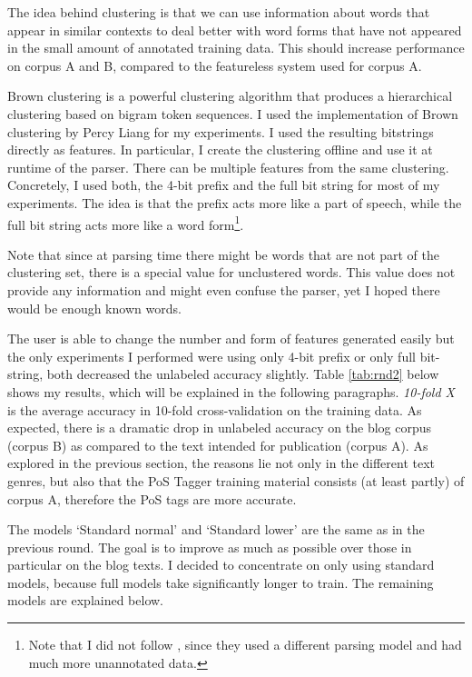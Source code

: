 \documentclass[11pt,letterpaper, covington]{article}
\begin{document}
The idea behind clustering is that we can use information about words that appear in similar contexts to deal better with word forms that have not appeared in the small amount of annotated training data. This should increase performance on corpus A and B, compared to the featureless system used for corpus A.

Brown clustering \citep{BSMPL92} is a powerful clustering algorithm that produces a hierarchical clustering based on bigram token sequences. I used the implementation of Brown clustering by Percy Liang \citep{liang05} for my experiments. I used the resulting bitstrings directly as features. In particular, I create the clustering offline and use it at runtime of the parser. There can be multiple features from the same clustering. Concretely, I used both, the 4-bit prefix and the full bit string for most of my experiments. The idea is that the prefix acts more like a part of speech, while the full bit string acts more like a word form\citep{KCC08}\footnote{Note that I did not follow \citet{KCC08}, since they used a different parsing model and had much more unannotated data.}.

Note that since at parsing time there might be words that are not part of the clustering set, there is a special value for unclustered words. This value does not provide any information and might even confuse the parser, yet I hoped there would be enough known words.

The user is able to change the number and form of features generated easily but the only experiments I performed were using only 4-bit prefix or only full bit-string, both decreased the unlabeled accuracy slightly. Table \ref{tab:rnd2} below shows my results, which will be explained in the following paragraphs. \emph{10-fold X} is the average accuracy in 10-fold cross-validation on the training data. As expected, there is a dramatic drop in unlabeled accuracy on the blog corpus (corpus B) as compared to the text intended for publication (corpus A). As explored in the previous section, the reasons lie not only in the different text genres, but also that the PoS Tagger training material consists (at least partly) of corpus A, therefore the PoS tags are more accurate. 

The models `Standard normal' and `Standard lower' are the same as in the previous round. The goal is to improve as much as possible over those in particular on the blog texts. I decided to concentrate on only using standard models, because full models take significantly longer to train. The remaining models are explained below.
\end{document}
